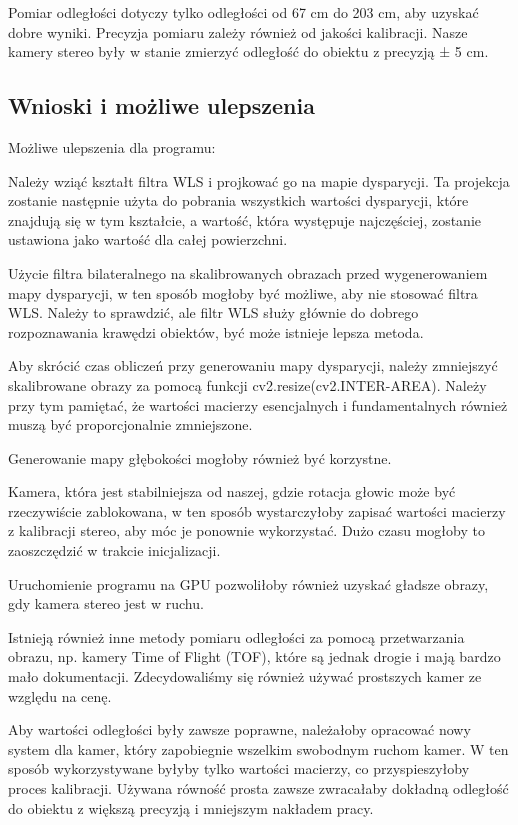 \documentclass[magisterska]{pracadypl}
\begin{document}
Pomiar odległości dotyczy tylko odległości od 67 cm do 203 cm, aby uzyskać dobre wyniki. Precyzja pomiaru zależy również od jakości kalibracji. Nasze kamery stereo były w stanie zmierzyć odległość do obiektu z precyzją ± 5 cm.

\subsection{Wnioski i możliwe ulepszenia}

Możliwe ulepszenia dla programu:

Należy wziąć kształt filtra WLS i projkować go na mapie dysparycji. Ta projekcja zostanie następnie użyta do pobrania wszystkich wartości dysparycji, które znajdują się w tym kształcie, a wartość, która występuje najczęściej, zostanie ustawiona jako wartość dla całej powierzchni.

Użycie filtra bilateralnego na skalibrowanych obrazach przed wygenerowaniem mapy dysparycji, w ten sposób mogłoby być możliwe, aby nie stosować filtra WLS. Należy to sprawdzić, ale filtr WLS służy głównie do dobrego rozpoznawania krawędzi obiektów, być może istnieje lepsza metoda.

Aby skrócić czas obliczeń przy generowaniu mapy dysparycji, należy zmniejszyć skalibrowane obrazy za pomocą funkcji cv2.resize(cv2.INTER-AREA). Należy przy tym pamiętać, że wartości macierzy esencjalnych i fundamentalnych również muszą być proporcjonalnie zmniejszone.

Generowanie mapy głębokości mogłoby również być korzystne.

Kamera, która jest stabilniejsza od naszej, gdzie rotacja głowic może być rzeczywiście zablokowana, w ten sposób wystarczyłoby zapisać wartości macierzy z kalibracji stereo, aby móc je ponownie wykorzystać. Dużo czasu mogłoby to zaoszczędzić w trakcie inicjalizacji.

Uruchomienie programu na GPU pozwoliłoby również uzyskać gładsze obrazy, gdy kamera stereo jest w ruchu.

Istnieją również inne metody pomiaru odległości za pomocą przetwarzania obrazu, np. kamery Time of Flight (TOF), które są jednak drogie i mają bardzo mało dokumentacji. Zdecydowaliśmy się również używać prostszych kamer ze względu na cenę.

Aby wartości odległości były zawsze poprawne, należałoby opracować nowy system dla kamer, który zapobiegnie wszelkim swobodnym ruchom kamer. W ten sposób wykorzystywane byłyby tylko wartości macierzy, co przyspieszyłoby proces kalibracji. Używana równość prosta zawsze zwracałaby dokładną odległość do obiektu z większą precyzją i mniejszym nakładem pracy.
\end{document}
